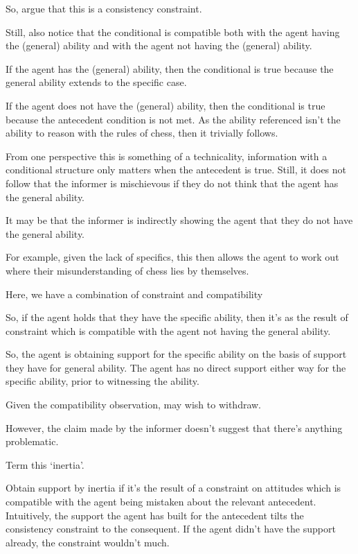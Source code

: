 \documentclass[10pt]{article}
\begin{document}
\begin{note}
  So, argue that this is a consistency constraint.

  Still, also notice that the conditional is compatible both with the agent having the (general) ability and with the agent not having the (general) ability.

  If the agent has the (general) ability, then the conditional is true because the general ability extends to the specific case.

  If the agent does not have the (general) ability, then the conditional is true because the antecedent condition is not met.
  As the ability referenced isn't the ability to reason with the rules of chess, then it trivially follows.

  From one perspective this is something of a technicality, information with a conditional structure only matters when the antecedent is true.
  Still, it does not follow that the informer is mischievous if they do not think that the agent has the general ability.

  It may be that the informer is indirectly showing the agent that they do not have the general ability.

  For example, given the lack of specifics, this then allows the agent to work out where their misunderstanding of chess lies by themselves.
\end{note}

\begin{note}
  Here, we have a combination of constraint and compatibility

  So, if the agent holds that they have the specific ability, then it's as the result of constraint which is compatible with the agent not having the general ability.

  So, the agent is obtaining support for the specific ability on the basis of support they have for general ability.
  The agent has no direct support either way for the specific ability, prior to witnessing the ability.
\end{note}

\begin{note}[Rejection]
  Given the compatibility observation, may wish to withdraw.

  However, the claim made by the informer doesn't suggest that there's anything problematic.
\end{note}

\begin{note}[Inertia]
  Term this `inertia'.

  Obtain support by inertia if it's the result of a constraint on attitudes which is compatible with the agent being mistaken about the relevant antecedent.
  Intuitively, the support the agent has built for the antecedent tilts the consistency constraint to the consequent.
  If the agent didn't have the support already, the constraint wouldn't much.
\end{note}
\end{document}
